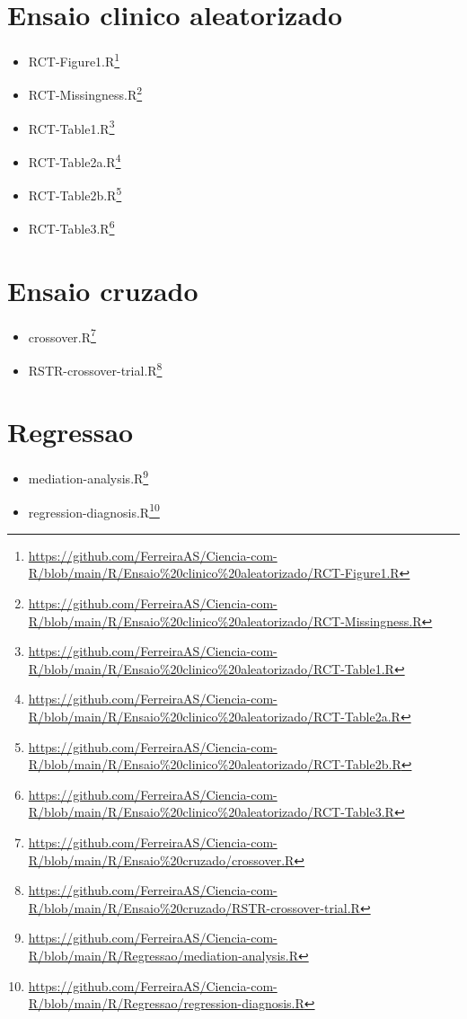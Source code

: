 \documentclass[
  a4paper,
]{book}
\renewcommand{\href}[2]{#2\footnote{\url{#1}}}
\begin{document}
\hypertarget{ensaio-clinico-aleatorizado}{%
\section{Ensaio clinico aleatorizado}\label{ensaio-clinico-aleatorizado}}

\begin{itemize}
\item
  \href{https://github.com/FerreiraAS/Ciencia-com-R/blob/main/R/Ensaio\%20clinico\%20aleatorizado/RCT-Figure1.R}{RCT-Figure1.R}
\item
  \href{https://github.com/FerreiraAS/Ciencia-com-R/blob/main/R/Ensaio\%20clinico\%20aleatorizado/RCT-Missingness.R}{RCT-Missingness.R}
\item
  \href{https://github.com/FerreiraAS/Ciencia-com-R/blob/main/R/Ensaio\%20clinico\%20aleatorizado/RCT-Table1.R}{RCT-Table1.R}
\item
  \href{https://github.com/FerreiraAS/Ciencia-com-R/blob/main/R/Ensaio\%20clinico\%20aleatorizado/RCT-Table2a.R}{RCT-Table2a.R}
\item
  \href{https://github.com/FerreiraAS/Ciencia-com-R/blob/main/R/Ensaio\%20clinico\%20aleatorizado/RCT-Table2b.R}{RCT-Table2b.R}
\item
  \href{https://github.com/FerreiraAS/Ciencia-com-R/blob/main/R/Ensaio\%20clinico\%20aleatorizado/RCT-Table3.R}{RCT-Table3.R}
\end{itemize}

\hypertarget{ensaio-cruzado}{%
\section{Ensaio cruzado}\label{ensaio-cruzado}}

\begin{itemize}
\item
  \href{https://github.com/FerreiraAS/Ciencia-com-R/blob/main/R/Ensaio\%20cruzado/crossover.R}{crossover.R}
\item
  \href{https://github.com/FerreiraAS/Ciencia-com-R/blob/main/R/Ensaio\%20cruzado/RSTR-crossover-trial.R}{RSTR-crossover-trial.R}
\end{itemize}

\hypertarget{regressao}{%
\section{Regressao}\label{regressao}}

\begin{itemize}
\item
  \href{https://github.com/FerreiraAS/Ciencia-com-R/blob/main/R/Regressao/mediation-analysis.R}{mediation-analysis.R}
\item
  \href{https://github.com/FerreiraAS/Ciencia-com-R/blob/main/R/Regressao/regression-diagnosis.R}{regression-diagnosis.R}
\end{itemize}
\end{document}
